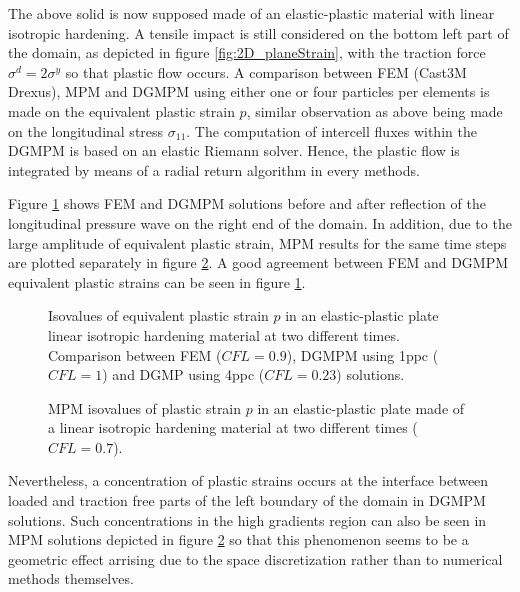 The above solid is now supposed made of an elastic-plastic material with linear isotropic hardening. A tensile impact is still considered on the bottom left part of the domain, as depicted in figure \ref{fig:2D_planeStrain}, with the traction force $\sigma^d=2\sigma^y$ so that plastic flow occurs. A comparison between FEM (Cast3M Drexus), MPM and DGMPM using either one or four particles per elements is made on the equivalent plastic strain $p$, similar observation as above being made on the longitudinal stress $\sigma_{11}$.
The computation of intercell fluxes within the DGMPM is based on an elastic Riemann solver. Hence, the plastic flow is integrated by means of a radial return algorithm in every methods.

Figure \ref{fig:2dEP_comparison} shows FEM and DGMPM solutions before and after reflection of the longitudinal pressure wave on the right end of the domain. In addition, due to the large amplitude of equivalent plastic strain, MPM results for the same time steps are plotted separately in figure \ref{fig:2dEP_mpm}. A good agreement between FEM and DGMPM equivalent plastic strains can be seen in figure \ref{fig:2dEP_comparison}. 
\begin{figure}[h!]
  \centering
  
  \caption{Isovalues of equivalent plastic strain $p$ in an elastic-plastic plate linear isotropic hardening material at two different times. Comparison between FEM ($CFL=0.9$), DGMPM using 1ppc ($CFL=1$) and DGMP using 4ppc ($CFL=0.23$) solutions.}
  \label{fig:2dEP_comparison}
\end{figure}
\begin{figure}[h!]
  \centering
  
  \caption{MPM isovalues of plastic strain $p$ in an elastic-plastic plate made of a linear isotropic hardening material at two different times ($CFL=0.7$).}
  \label{fig:2dEP_mpm}
\end{figure}
Nevertheless, a concentration of plastic strains occurs at the interface between loaded and traction free parts of the left boundary of the domain in DGMPM solutions. 
Such concentrations in the high gradients region can also be seen in MPM solutions depicted in figure \ref{fig:2dEP_mpm} so that this phenomenon seems to be a geometric effect arrising due to the space discretization rather than to numerical methods themselves.
%   
